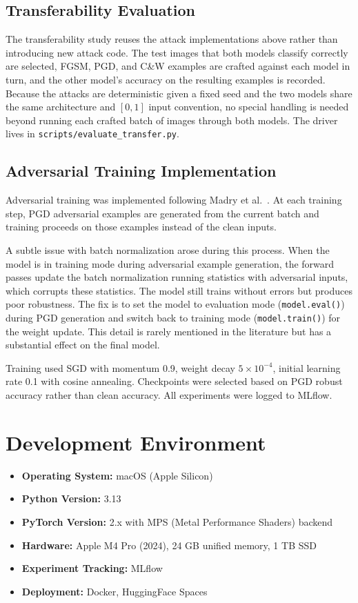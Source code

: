 \subsection{Transferability Evaluation}

The transferability study reuses the attack implementations above rather than introducing new attack code. The test images that both models classify correctly are selected, FGSM, PGD, and C\&W examples are crafted against each model in turn, and the other model's accuracy on the resulting examples is recorded. Because the attacks are deterministic given a fixed seed and the two models share the same architecture and $[0, 1]$ input convention, no special handling is needed beyond running each crafted batch of images through both models. The driver lives in \texttt{scripts/evaluate\_transfer.py}.

\subsection{Adversarial Training Implementation}

Adversarial training was implemented following Madry et al.~\cite{madry2018towards}. At each training step, PGD adversarial examples are generated from the current batch and training proceeds on those examples instead of the clean inputs.

A subtle issue with batch normalization arose during this process. When the model is in training mode during adversarial example generation, the forward passes update the batch normalization running statistics with adversarial inputs, which corrupts these statistics. The model still trains without errors but produces poor robustness. The fix is to set the model to evaluation mode (\texttt{model.eval()}) during PGD generation and switch back to training mode (\texttt{model.train()}) for the weight update. This detail is rarely mentioned in the literature but has a substantial effect on the final model.

Training used SGD with momentum 0.9, weight decay $5 \times 10^{-4}$, initial learning rate 0.1 with cosine annealing. Checkpoints were selected based on PGD robust accuracy rather than clean accuracy. All experiments were logged to MLflow.

\section{Development Environment}

\begin{itemize}
    \item \textbf{Operating System:} macOS (Apple Silicon)
    \item \textbf{Python Version:} 3.13
    \item \textbf{PyTorch Version:} 2.x with MPS (Metal Performance Shaders) backend
    \item \textbf{Hardware:} Apple M4 Pro (2024), 24 GB unified memory, 1 TB SSD
    \item \textbf{Experiment Tracking:} MLflow
    \item \textbf{Deployment:} Docker, HuggingFace Spaces
\end{itemize}

